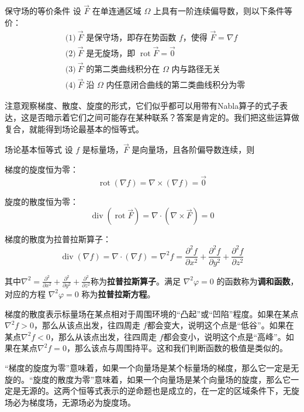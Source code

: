 \begin{theorem}{保守场的等价条件}{}
  设 \(\vec{F}\) 在单连通区域 \(\Omega\) 上具有一阶连续偏导数，则以下条件等价：
\[
\begin{aligned}
&\text{(1)}\ \vec{F}\text{ 是保守场，即存在势函数 }f\text{，使得 }\vec{F}=\nabla f \\[6pt]
&\text{(2)}\ \vec{F}\text{ 是无旋场，即 }\operatorname{rot}\vec{F}=\vec{0} \\[6pt]
&\text{(3)}\ \vec{F}\text{ 的第二类曲线积分在 }\Omega\text{ 内与路径无关} \\[6pt]
&\text{(4)}\ \vec{F}\text{ 沿 }\Omega\text{ 内任意闭合曲线的第二类曲线积分为零}
\end{aligned}
\]
\end{theorem}

注意观察梯度、散度、旋度的形式，它们似乎都可以用带有Nabla算子的式子表达，这是否暗示着它们之间可能存在某种联系？答案是肯定的。我们把这些运算做复合，就能得到场论最基本的恒等式。

\begin{theorem}{场论基本恒等式}{}
  设 \(f\) 是标量场，\(\vec{F}\) 是向量场，且各阶偏导数连续，则

  梯度的旋度恒为零：
  \[
  \operatorname{rot}(\nabla f)=\nabla \times (\nabla f)=\vec{0}
  \]

  旋度的散度恒为零：
  \[
  \operatorname{div}(\operatorname{rot}\vec{F})=\nabla \cdot (\nabla \times \vec{F})=0
  \]

  梯度的散度为拉普拉斯算子：
  \[
  \operatorname{div}(\nabla f)=\nabla \cdot (\nabla f)
  =\nabla^2 f
  =\frac{\partial^2 f}{\partial x^2}+\frac{\partial^2 f}{\partial y^2}+\frac{\partial^2 f}{\partial z^2}
  \]

其中\(\nabla^2=\frac{\partial^2}{\partial x^2}+\frac{\partial^2}{\partial y^2}+\frac{\partial^2}{\partial z^2}\)称为\textbf{拉普拉斯算子}。满足 \(\nabla^2\varphi=0\) 的函数称为\textbf{调和函数}，对应的方程 \(\nabla^2\varphi=0\) 称为\textbf{拉普拉斯方程}。
\end{theorem}

梯度的散度表示标量场在某点相对于周围环境的“凸起”或“凹陷”程度。如果在某点\(\nabla^2 f>0\)，那么从该点出发，往四周走 \(f\)都会变大，说明这个点是“低谷”。如果在某点\(\nabla^2 f<0\)，那么从该点出发，往四周走 \(f\)都会变小，说明这个点是“高峰”。如果在某点\(\nabla^2 f=0\)，那么该点与周围持平。这和我们判断函数的极值是类似的。

“梯度的旋度为零”意味着，如果一个向量场是某个标量场的梯度，那么它一定是无旋的。“旋度的散度为零”意味着，如果一个向量场是某个向量场的旋度，那么它一定是无源的。这两个恒等式表示的逆命题也是成立的，在一定的区域条件下，无旋场必为梯度场，无源场必为旋度场。

